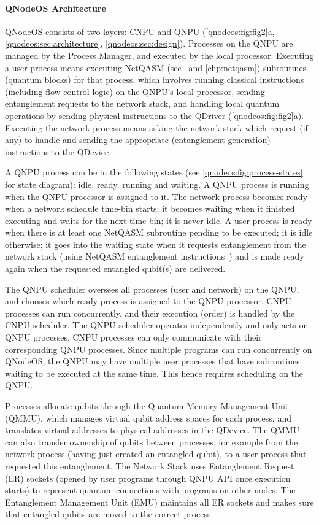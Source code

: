 \paragraph{QNodeOS Architecture}

QNodeOS consists of two layers: CNPU and QNPU (\cref{qnodeos:fig:fig2}a, \cref{qnodeos:sec:architecture}, \cref{qnodeos:sec:design}).
Processes on the QNPU are managed by the Process Manager, and executed by the local processor.
Executing a user process means executing NetQASM (see~\cite{dahlberg_2022_netqasm} and \cref{chp:netqasm}) subroutines (quantum blocks) for that process, which involves running classical instructions (including flow control logic) on the QNPU's local processor, sending entanglement requests to the network stack, and handling local quantum operations by sending physical instructions to the QDriver (\cref{qnodeos:fig:fig2}a).
Executing the network process means asking the network stack which request (if any) to handle and sending the appropriate (entanglement generation) instructions to the QDevice. 

A QNPU process can be in the following states (see \cref{qnodeos:fig:process-states} for state diagram): idle, ready, running and waiting.
A QNPU process is running when the QNPU processor is assigned to it.
The network process becomes ready when a network schedule time-bin starts; it becomes waiting when it finished executing and waits for the next time-bin; it is never idle.
A user process is ready when there is at least one NetQASM subroutine pending to be executed; it is idle otherwise; it goes into the waiting state when it requests entanglement from the network stack (using NetQASM entanglement instructions~\cite{dahlberg_2022_netqasm}) and is made ready again when the requested entangled qubit(s) are delivered. 

The QNPU scheduler oversees all processes (user and network) on the QNPU, and chooses which ready process is assigned to the QNPU processor.
CNPU processes can run concurrently, and their execution (order) is handled by the CNPU scheduler.
The QNPU scheduler operates independently and only acts on QNPU processes.
CNPU processes can only communicate with their corresponding QNPU processes.
Since multiple programs can run concurrently on QNodeOS, the QNPU may have multiple user processes that have subroutines waiting to be executed at the same time.
This hence requires scheduling on the QNPU.

Processes allocate qubits through the Quantum Memory Management Unit (QMMU), which manages virtual qubit address spaces for each process, and translates virtual addresses to physical addresses in the QDevice.
The QMMU can also transfer ownership of qubits between processes, for example from the network process (having just created an entangled qubit), to a user process that requested this entanglement.
The Network Stack uses Entanglement Request (ER) sockets (opened by user programs through QNPU API once execution starts) to represent quantum connections with programs on other nodes.
The Entanglement Management Unit (EMU) maintains all ER sockets and makes sure that entangled qubits are moved to the correct process.

